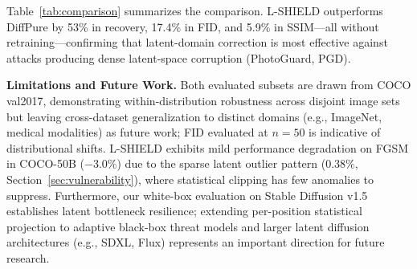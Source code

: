 \documentclass[conference]{IEEEtran}
\begin{document}
Table~\ref{tab:comparison} summarizes the comparison.
L-SHIELD outperforms DiffPure by 53\% in recovery, 17.4\% in FID, and 5.9\%
in SSIM---all without retraining---confirming that latent-domain correction
is most effective against attacks producing dense latent-space corruption (PhotoGuard, PGD).

\begin{table}[t]
\caption{Comparison with Prior Defenses on COCO-50 (averages across all four
attacks). Input Transform and Adversarial Training not evaluated on SD img2img.}
\label{tab:comparison}
\centering
\renewcommand{\arraystretch}{1.08}
\end{table}


\textbf{Limitations and Future Work.}
Both evaluated subsets are drawn from COCO val2017, demonstrating within-distribution robustness
across disjoint image sets but leaving cross-dataset generalization to distinct domains (e.g., ImageNet, medical modalities) as future work; FID evaluated at $n{=}50$ is indicative of distributional shifts.
L-SHIELD exhibits mild performance degradation on FGSM in COCO-50B ($-3.0\%$) due to the sparse latent
outlier pattern ($0.38\%$, Section~\ref{sec:vulnerability}), where statistical clipping has few anomalies to suppress. Furthermore, our white-box evaluation on Stable Diffusion v1.5 establishes latent bottleneck resilience; extending per-position statistical projection to adaptive black-box threat models and larger latent diffusion architectures (e.g., SDXL, Flux) represents an important direction for future research.
\end{document}
